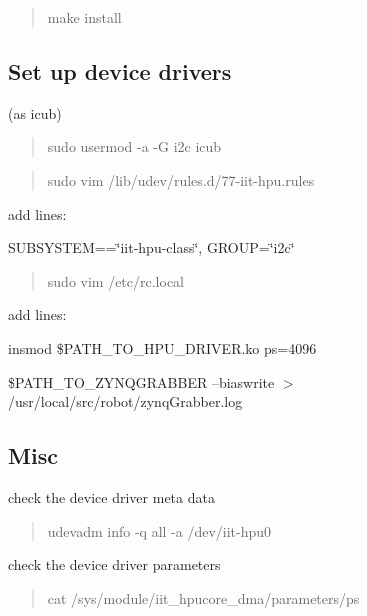 \begin{quote}
make install \end{quote}


\subsection*{Set up device drivers}

(as icub)

\begin{quote}
sudo usermod -\/a -\/G i2c icub \end{quote}


\begin{quote}
sudo vim /lib/udev/rules.d/77-\/iit-\/hpu.\+rules \end{quote}


add lines\+:


\begin{DoxyItemize}
\item S\+U\+B\+S\+Y\+S\+T\+EM==\char`\"{}iit-\/hpu-\/class\char`\"{}, G\+R\+O\+UP=\char`\"{}i2c\char`\"{}
\end{DoxyItemize}

\begin{quote}
sudo vim /etc/rc.local \end{quote}


add lines\+:


\begin{DoxyItemize}
\item insmod \$\+P\+A\+T\+H\+\_\+\+T\+O\+\_\+\+H\+P\+U\+\_\+\+D\+R\+I\+V\+E\+R.\+ko ps=4096
\item \$\+P\+A\+T\+H\+\_\+\+T\+O\+\_\+\+Z\+Y\+N\+Q\+G\+R\+A\+B\+B\+ER --biaswrite $>$ /usr/local/src/robot/zynq\+Grabber.log
\end{DoxyItemize}

\subsection*{Misc}

check the device driver meta data

\begin{quote}
udevadm info -\/q all -\/a /dev/iit-\/hpu0 \end{quote}


check the device driver parameters

\begin{quote}
cat /sys/module/iit\+\_\+hpucore\+\_\+dma/parameters/ps \end{quote}


